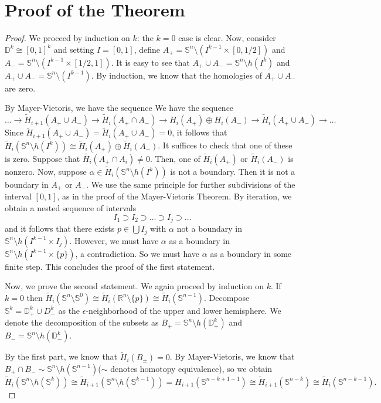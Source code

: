 \documentclass[11pt]{scrartcl}
\newcommand{\R}{\mathbb{R}}
\renewcommand{\tilde}{\widetilde}
\begin{document}
\section{Proof of the Theorem}
\begin{proof}
We proceed by induction on $k$:  the $k = 0$ case is clear.  Now, consider $\mathbb D^k \cong [0, 1]^k$ and setting $I = [0, 1]$, define $A_+ = \mathbb S^n \setminus(I^{k-1} \times [0, 1/2])$ and $A_- = \mathbb S^n \setminus(I^{k-1} \times [1/2, 1])$.  It is easy to see that $A_+ \cup A_- = \mathbb S^n\setminus h(I^k)$ and $A_+ \cup A_- = \mathbb S^n \setminus (I^{k-1})$.  By induction, we know that the homologies of $A_+ \cup A_-$ are zero.  

By Mayer-Vietoris, we have the sequence
We have the sequence
$$\dots \to \tilde H_{i+1}(A_+ \cup A_-) \to \tilde H_{i}(A_+ \cap A_-) \to H_i(A_+) \oplus H_i(A_-) \to \tilde H_i(A_+ \cup A_-)\to \dots$$
Since $ \tilde H_{i+1}(A_+ \cup A_-) = \tilde H_i(A_+ \cup A_-) = 0$, it follows that $\tilde H_i(\mathbb S^n\setminus h(I^k)) \cong \tilde H_i(A_+) \oplus \tilde H_i(A_-)$.  It suffices to check that one of these is zero.  Suppose that $\tilde {H_i}(A_+ \cap A_i) \ne 0$.  Then, one of $\tilde H_i(A_+)$ or $\tilde H_i(A_-)$ is nonzero.  Now, suppose $\alpha \in \tilde H_i(\mathbb S^n \setminus h(I^k))$ is not a boundary.  Then it is not a boundary in $A_+$ or $A_-$. We use the same principle for further subdivisions of the interval $[0, 1]$, as in the proof of the Mayer-Vietoris Theorem.  By iteration, we obtain a nested sequence of intervals
$$I_1 \supset I_2 \supset \dots \supset I_j \supset \dots$$
and it follows that there exists $p \in \bigcup I_j$ with $\alpha$ not a boundary in $\mathbb S^n \setminus h(I^{k-1} \times I_j)$.  However, we must have $\alpha$ as a boundary in $\mathbb S^n \setminus h(I^{k-1} \times \{p\})$, a contradiction.  So we must have $\alpha$ as a boundary in some finite step.  This concludes the proof of the first statement.

Now, we prove the second statement.  We again proceed by induction on $k$.  If $k = 0$
 then $\tilde H_i(\mathbb S^n \setminus \mathbb S^0) \cong \tilde H_i(\R^n \setminus \{p\}) \cong \tilde H_i(\mathbb S^{n-1})$.  Decompose $\mathbb S^k = \mathbb D_+^k \cup D_-^k$ as the $\epsilon$-neighborhood of the upper and lower hemisphere.  We denote the decomposition of the subsets as $B_+ = \mathbb S^n \setminus h(\mathbb D_+^k)$ and $B_- = \mathbb S^n \setminus h(\mathbb D_-^k)$.

By the first part, we know that $\tilde H_i(B_\pm) = 0$.  By Mayer-Vietoris, we know that $B_+ \cap B_- \sim \mathbb S^n \setminus h(\mathbb S^{n-1})$($\sim$ denotes homotopy equivalence), so we obtain
$$\tilde H_i(\mathbb S^n \setminus h(\mathbb S^k)) \cong \tilde H_{i+1}(\mathbb S^n \setminus h(\mathbb S^{k-1})) = H_{i+1}(\mathbb S^{n - k + 1 - 1}) \cong \tilde H_{i+1}(\mathbb S^{n-k}) \cong \tilde H_i(\mathbb S^{n - k - 1}).$$
\end{proof}
\end{document}
